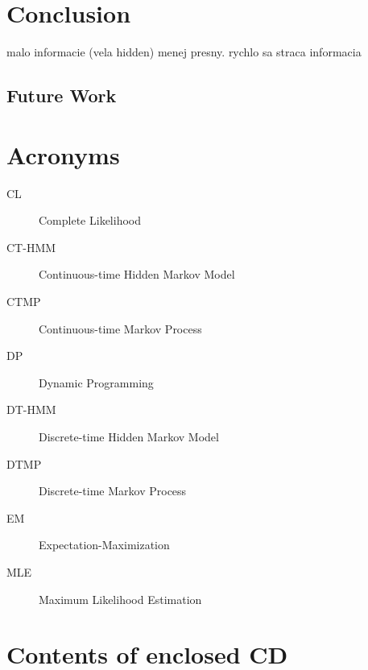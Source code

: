 \documentclass[thesis=M,english]{FITthesis}[2012/10/20]
\begin{document}




\chapter{Conclusion}

malo informacie (vela hidden) menej presny.
rychlo sa straca informacia 

\section{Future Work}





\appendix

\chapter{Acronyms}
\begin{description}
	\item[CL] Complete Likelihood
	\item[CT-HMM] Continuous-time Hidden Markov Model
	\item[CTMP] Continuous-time Markov Process
	\item[DP] Dynamic Programming
	\item[DT-HMM] Discrete-time Hidden Markov Model	
	\item[DTMP] Discrete-time Markov Process	
	\item[EM] Expectation-Maximization 
	\item[MLE] Maximum Likelihood Estimation
	
\end{description}


\chapter{Contents of enclosed CD}


\begin{figure}
\end{figure}
\end{document}
